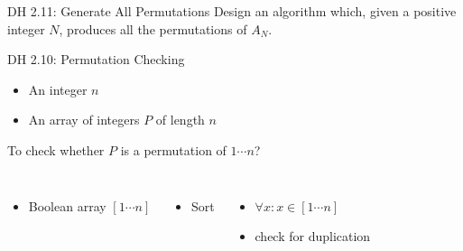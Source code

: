 \begin{frame}{}
  \begin{exampleblock}{DH 2.11: Generate All Permutations}
    Design an algorithm which, given a positive integer $N$,
    produces all the permutations of $A_N$.
  \end{exampleblock}


\end{frame}

\begin{frame}{}
  \begin{exampleblock}{DH 2.10: Permutation Checking}
    \begin{itemize}
      \item An integer $n$
      \item An array of integers $P$ of length $n$
    \end{itemize}
    To check whether $P$ is a permutation of $1 \cdots n$?
  \end{exampleblock}

  \vspace{0.60cm}
  \pause

  \begin{columns}
    \pause
      \begin{itemize}
	\item Boolean array $[1 \cdots n]$
      \end{itemize}
    \pause
      \begin{itemize}
	\item Sort
      \end{itemize}
    \pause
      \begin{itemize}
	\item $\forall x: x \in [1 \cdots n]$
	\item check for duplication
      \end{itemize}
  \end{columns}
\end{frame}
